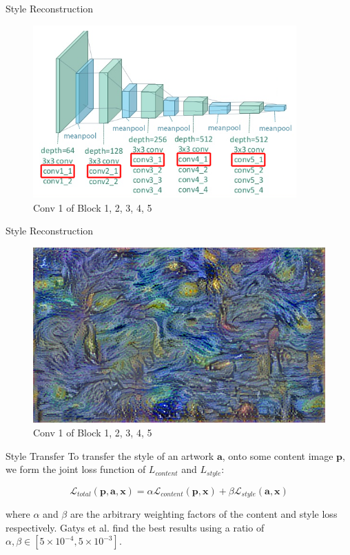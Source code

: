 \documentclass{beamer}
\begin{document}
\begin{frame}{Style Reconstruction}
\begin{figure}[ht]
\centering
\caption*{Conv 1 of Block 1, 2, 3, 4, 5}
\includegraphics[width=0.9\textwidth]{img/vgg19/style/block5_conv1}
\end{figure}
\end{frame}
\begin{frame}{Style Reconstruction}
\begin{figure}[ht]
\centering
\caption*{Conv 1 of Block 1, 2, 3, 4, 5}
\includegraphics[width=\textwidth]{img/style/block5_conv1.png}
\end{figure}
\end{frame}



\begin{frame}{Style Transfer}
To transfer the style of an artwork $\textbf{a}$, onto some content image
$\textbf{p}$, we form the joint loss function of $L_{content}$ and
$L_{style}$:

\begin{equation}
    \mathcal{L}_{total}(\mathbf{p}, \mathbf{a}, \mathbf{x}) =
    \alpha \mathcal{L}_{content}(\mathbf{p}, \mathbf{x}) +
    \beta \mathcal{L}_{style}(\mathbf{a}, \mathbf{x})
\end{equation}

where $\alpha$ and $\beta$ are the arbitrary weighting factors of the content
and style loss respectively. Gatys et al. find the best results using a ratio
of $\alpha, \beta \in [5\times10^{-4}, 5\times10^{-3}]$.
\end{frame}
\end{document}
